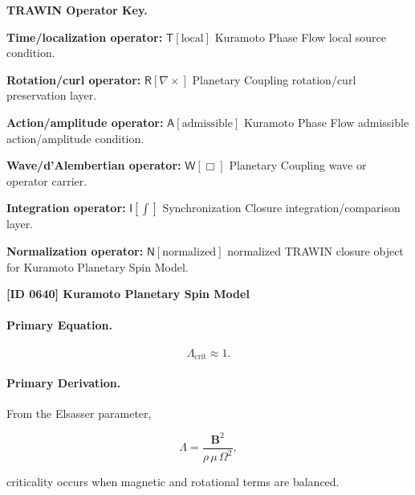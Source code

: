 \par\vspace{0.45\baselineskip}
\noindent\begin{minipage}[t]{\linewidth}
\begingroup
\small
\raggedright
\textbf{TRAWIN Operator Key.}\par
\noindent\textbf{Time/localization operator:} $\mathsf{T}\!\left[\mathrm{local}\right]$ Kuramoto Phase Flow local source condition.\par
\noindent\textbf{Rotation/curl operator:} $\mathsf{R}\!\left[\nabla\times\right]$ Planetary Coupling rotation/curl preservation layer.\par
\noindent\textbf{Action/amplitude operator:} $\mathsf{A}\!\left[\mathrm{admissible}\right]$ Kuramoto Phase Flow admissible action/amplitude condition.\par
\noindent\textbf{Wave/d'Alembertian operator:} $\mathsf{W}\!\left[\Box\right]$ Planetary Coupling wave or operator carrier.\par
\noindent\textbf{Integration operator:} $\mathsf{I}\!\left[\int\right]$ Synchronization Closure integration/comparison layer.\par
\noindent\textbf{Normalization operator:} $\mathsf{N}\!\left[\mathrm{normalized}\right]$ normalized TRAWIN closure object for Kuramoto Planetary Spin Model.\par
\endgroup
\end{minipage}

\clearpage
\noindent\textbf{[ID 0640] Kuramoto Planetary Spin Model}\par
\vspace{0.35em}
\paragraph{Primary Equation.}
\begin{equation}
\Lambda_{\mathrm{crit}}\approx 1 .
\end{equation}

\paragraph{Primary Derivation.}
From the Elsasser parameter,

\begin{equation}
\Lambda
=
\frac{\mathbf{B}^2}
{\rho\,\mu\,\Omega^2},
\end{equation}

criticality occurs when magnetic and rotational terms are balanced.

